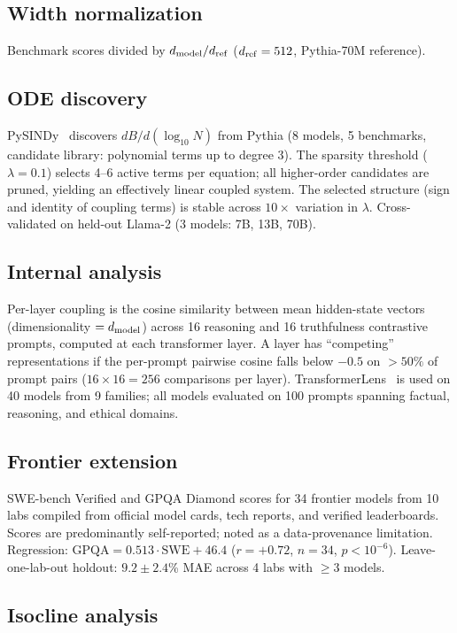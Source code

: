 \documentclass{article}
\begin{document}
\subsection{Width normalization}
Benchmark scores divided by $d_{\rm model} / d_{\rm ref}$ ($d_{\rm ref} = 512$, Pythia-70M reference).

\subsection{ODE discovery}
PySINDy~\cite{brunton2016} discovers $dB/d(\log_{10} N)$ from Pythia
(8 models, 5 benchmarks, candidate library: polynomial terms up to degree 3).
The sparsity threshold ($\lambda = 0.1$) selects 4--6 active terms per equation;
all higher-order candidates are pruned, yielding an effectively linear coupled system.
The selected structure (sign and identity of coupling terms) is stable across
$10\times$ variation in $\lambda$.
Cross-validated on held-out Llama-2 (3 models: 7B, 13B, 70B).

\subsection{Internal analysis}
Per-layer coupling is the cosine similarity between mean hidden-state vectors
(dimensionality $= d_{\rm model}$) across 16 reasoning and 16 truthfulness contrastive prompts,
computed at each transformer layer.
A layer has ``competing'' representations if the per-prompt pairwise cosine
falls below $-0.5$ on $> 50\%$ of prompt pairs ($16 \times 16 = 256$ comparisons per layer).
TransformerLens~\cite{nanda2022} is used on 40 models from 9 families;
all models evaluated on 100 prompts spanning factual, reasoning, and ethical domains.

\subsection{Frontier extension}
SWE-bench Verified and GPQA Diamond scores for 34 frontier models from 10 labs
compiled from official model cards, tech reports, and verified leaderboards.
Scores are predominantly self-reported; noted as a data-provenance limitation.
Regression: $\text{GPQA} = 0.513 \cdot \text{SWE} + 46.4$ ($r = +0.72$, $n = 34$, $p < 10^{-6}$).
Leave-one-lab-out holdout: $9.2 \pm 2.4$\% MAE across 4 labs with $\geq 3$ models.

\subsection{Isocline analysis}
\label{app:isocline}
\end{document}
